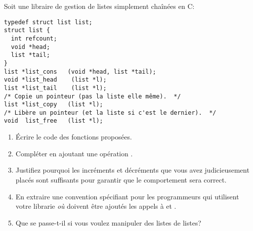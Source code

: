 \begin{Exercise}[title={Compteur de références}]
  \label{ex:compteur_reference}
Soit une libraire de gestion de listes simplement chaînées en C:
\begin{verbatim}
typedef struct list list;
struct list {
  int refcount;
  void *head;
  list *tail;
}
list *list_cons   (void *head, list *tail);
void *list_head    (list *l);
list *list_tail    (list *l);
/* Copie un pointeur (pas la liste elle même).  */
list *list_copy   (list *l);
/* Libère un pointeur (et la liste si c'est le dernier).  */
void  list_free   (list *l);
\end{verbatim}

\begin{enumerate}
\item Écrire le code des fonctions proposées.
\item Compléter en ajoutant une opération .
\item Justifiez pourquoi les incréments et décréments que vous avez
judicieusement placés sont suffisants pour garantir que le comportement
sera correct.
\item En extraire une convention spécifiant pour les programmeurs qui
utilisent votre librarie \emph{où} doivent être ajoutés les appels à
 et .
\item Que se passe-t-il si vous voulez manipuler des listes de listes?
\end{enumerate}
\end{Exercise}

\begin{Answer}[ref={ex:compteur_reference}]
\end{Answer}